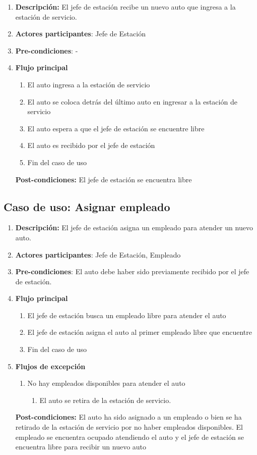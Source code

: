 \documentclass[12pt,a4paper,titlepage,oneside]{article}
\begin{document}
\begin{enumerate}
\item \textbf{Descripción:} El jefe de estación recibe un nuevo auto que ingresa a la estación de servicio.
\item \textbf{Actores participantes}: Jefe de Estación
\item \textbf{Pre-condiciones}: -
\item \textbf{Flujo principal}
\begin{enumerate}
\item El auto ingresa a la estación de servicio
\item El auto se coloca detrás del último auto en ingresar a la estación de servicio
\item El auto espera a que el jefe de estación se encuentre libre
\item El auto es recibido por el jefe de estación
\item Fin del caso de uso
\end{enumerate}
\textbf{Post-condiciones:} El jefe de estación se encuentra libre
\end{enumerate}

\subsection{Caso de uso: Asignar empleado}

\begin{enumerate}
\item \textbf{Descripción:} El jefe de estación asigna un empleado para atender un nuevo auto. 
\item \textbf{Actores participantes}: Jefe de Estación, Empleado
\item \textbf{Pre-condiciones}: El auto debe haber sido previamente recibido por el jefe de estación.
\item \textbf{Flujo principal}
\begin{enumerate}
\item El jefe de estación busca un empleado libre para atender el auto
\item El jefe de estación asigna el auto al primer empleado libre que encuentre
\item Fin del caso de uso
\end{enumerate}
\item \textbf{Flujos de excepción}
\begin{enumerate}
\item No hay empleados disponibles para atender el auto
\begin{enumerate}
\item El auto se retira de la estación de servicio.
\end{enumerate}
\end{enumerate}
\textbf{Post-condiciones:} El auto ha sido asignado a un empleado o bien se ha retirado de la estación de servicio por no haber empleados disponibles. El empleado se encuentra ocupado atendiendo el auto y el jefe de estación se encuentra libre para recibir un nuevo auto
\end{enumerate}
\end{document}
